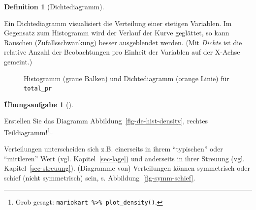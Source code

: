 \documentclass[
  letterpaper,
  twoside,
  open=any]{scrbook}
\theoremstyle{definition}
\newtheorem{definition}{Definition}[chapter]
\theoremstyle{definition}
\newtheorem{exercise}{Übungsaufgabe}[chapter]
\theoremstyle{definition}
\theoremstyle{remark}
\begin{document}
\begin{definition}[Dichtediagramm]\protect\hypertarget{def-dichtediagramm}{}\label{def-dichtediagramm}

Ein Dichtediagramm visualisiert die Verteilung einer stetigen Variablen.
Im Gegensatz zum Histogramm wird der Verlauf der Kurve geglättet, so
kann Rauschen (Zufallsschwankung) besser ausgeblendet werden. (Mit
\emph{Dichte} ist die relative Anzahl der Beobachtungen pro Einheit der
Variablen auf der X-Achse gemeint.)

\end{definition}

\begin{figure}


\caption{\label{fig-balken-total-pr-hist-dens}Histogramm (graue Balken)
und Dichtediagramm (orange Linie) für \texttt{total\_pr}}

\end{figure}%

\begin{exercise}[]\protect\hypertarget{exr-plot-density}{}\label{exr-plot-density}

Erstellen Sie das Diagramm Abbildung~\ref{fig-de-hist-density}, rechtes
Teildiagramm!\footnote{Grob gesagt:
  \texttt{mariokart\ \%\textgreater{}\%\ plot\_density()}.}\(\square\)

\end{exercise}

Verteilungen unterscheiden sich z.B. einerseits in ihrem
\enquote{typischen} oder \enquote{mittleren} Wert (vgl.
Kapitel~\ref{sec-lage}) und anderseits in ihrer Streuung (vgl.
Kapitel~\ref{sec-streuung}). (Diagramme von) Verteilungen können
symmetrisch oder schief (nicht symmetrisch) sein, s.
Abbildung~\ref{fig-symm-schief}.
\end{document}
